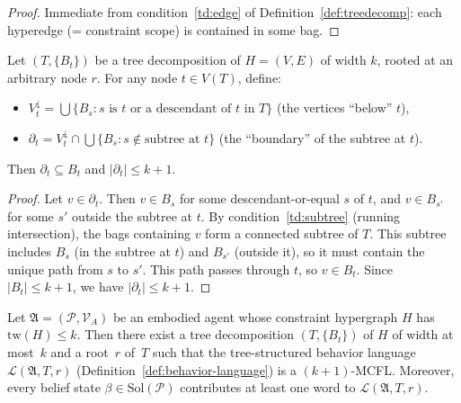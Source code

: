 \documentclass[runningheads]{llncs}
\begin{document}
\begin{proof}
Immediate from condition~\ref{td:edge} of Definition~\ref{def:treedecomp}: each hyperedge (= constraint scope) is contained in some bag.
\end{proof}

\begin{lemma}\label{lem:boundary}
Let $(T, \{B_t\})$ be a tree decomposition of $H = (V,E)$ of width $k$, rooted at an arbitrary node $r$.
For any node $t \in V(T)$, define:
\begin{itemize}[nosep]
  \item $V^{\downarrow}_t = \bigcup \{B_s : s \text{ is $t$ or a descendant of $t$ in $T$}\}$ (the vertices ``below'' $t$),
  \item $\partial_t = V^{\downarrow}_t \cap \bigcup\{B_s : s \notin \text{subtree at } t\}$ (the ``boundary'' of the subtree at $t$).
\end{itemize}
Then $\partial_t \subseteq B_t$ and $|\partial_t| \leq k + 1$.
\end{lemma}

\begin{proof}
Let $v \in \partial_t$.
Then $v \in B_s$ for some descendant-or-equal $s$ of $t$, and $v \in B_{s'}$ for some $s'$ outside the subtree at $t$.
By condition~\ref{td:subtree} (running intersection), the bags containing $v$ form a connected subtree of $T$.
This subtree includes $B_s$ (in the subtree at $t$) and $B_{s'}$ (outside it), so it must contain the unique path from $s$ to $s'$.
This path passes through $t$, so $v \in B_t$.
Since $|B_t| \leq k + 1$, we have $|\partial_t| \leq k + 1$.
\end{proof}

\begin{theorem}\label{thm:bridge}
Let $\mathfrak{A} = (\mathcal{P}, \mathcal{V}_A)$ be an embodied agent whose constraint hypergraph $H$ has $\mathrm{tw}(H) \leq k$.
Then there exist a tree decomposition $(T, \{B_t\})$ of $H$ of width at most~$k$ and a root~$r$ of~$T$ such that the tree-structured behavior language $\mathcal{L}(\mathfrak{A}, T, r)$ (Definition~\ref{def:behavior-language}) is a $(k{+}1)$-MCFL.
Moreover, every belief state $\beta \in \mathrm{Sol}(\mathcal{P})$ contributes at least one word to $\mathcal{L}(\mathfrak{A}, T, r)$.
\end{theorem}
\end{document}
